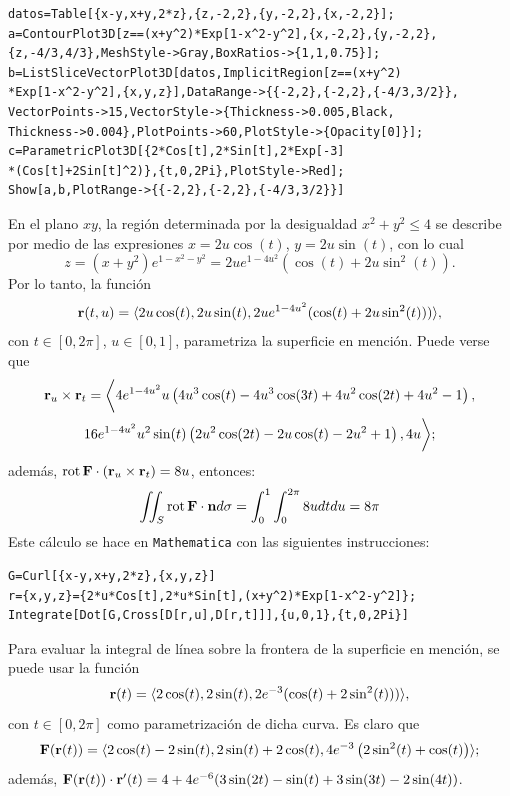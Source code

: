 \begin{tcolorbox}[title=\bf Instrucción \verb"Mathematica"]\begin{Verbatim}[formatcom=\letraverbatim]
datos=Table[{x-y,x+y,2*z},{z,-2,2},{y,-2,2},{x,-2,2}];
a=ContourPlot3D[z==(x+y^2)*Exp[1-x^2-y^2],{x,-2,2},{y,-2,2},
{z,-4/3,4/3},MeshStyle->Gray,BoxRatios->{1,1,0.75}];
b=ListSliceVectorPlot3D[datos,ImplicitRegion[z==(x+y^2)
*Exp[1-x^2-y^2],{x,y,z}],DataRange->{{-2,2},{-2,2},{-4/3,3/2}},
VectorPoints->15,VectorStyle->{Thickness->0.005,Black,
Thickness->0.004},PlotPoints->60,PlotStyle->{Opacity[0]}];
c=ParametricPlot3D[{2*Cos[t],2*Sin[t],2*Exp[-3]
*(Cos[t]+2Sin[t]^2)},{t,0,2Pi},PlotStyle->Red];
Show[a,b,PlotRange->{{-2,2},{-2,2},{-4/3,3/2}}]
\end{Verbatim}
\end{tcolorbox}

En el plano $xy$, la región determinada por la desigualdad $x^2+y^2\leq 4$ se describe por medio de las expresiones
$x=2u\cos(t)$, $y=2u\sin(t)$, con lo cual \[z=(x+y^2)e^{1-x^2-y^2}=2ue^{1-4u^2}(\cos(t)+2u\sin^2(t)).\]
Por lo tanto, la función
\[{\bf r}(t,u) = \langle 2u\cos(t),2u\sin(t) ,2ue^{1-4u^2}(\cos(t)+2u\sin^2(t)))\rangle,\]
con $t\in [0,2\pi]$, $u\in [0,1]$,  parametriza la superficie en mención.
Puede verse que
\begin{gather*}
{\bf r}_u \times {\bf r}_t = \bigg \langle 4 e^{1-4 u^2} u \left(4 u^3 \cos (t)-4 u^3 \cos (3 t)+4 u^2 \cos (2 t)+4 u^2-1\right),\\
16e^{1-4 u^2} u^2 \sin (t) \left(2 u^2 \cos (2t)-2 u \cos (t)-2 u^2+1\right),4 u\bigg \rangle;
\end{gather*}
además,
$\operatorname{rot}{\bf F}\cdot ({\bf r}_u \times {\bf r}_t)= 8u$, entonces:
\begin{equation} \label{stokes9}
\iint_S \operatorname{rot}{\bf F}\cdot {\bf n} d \sigma= \int_0^1\int_0^{2\pi} 8u dtdu =8\pi
\end{equation}
Este cálculo se hace en \verb"Mathematica" con las siguientes instrucciones:

\begin{tcolorbox}[title=\bf Instrucción \verb"Mathematica"]\begin{Verbatim}[formatcom=\letraverbatim]
G=Curl[{x-y,x+y,2*z},{x,y,z}]
r={x,y,z}={2*u*Cos[t],2*u*Sin[t],(x+y^2)*Exp[1-x^2-y^2]};
Integrate[Dot[G,Cross[D[r,u],D[r,t]]],{u,0,1},{t,0,2Pi}]
\end{Verbatim}
\end{tcolorbox}

Para evaluar la integral de línea sobre la frontera de la superficie en mención, se puede usar la función
\[{\bf r}(t) = \langle 2\cos(t),2\sin(t) ,2e^{-3}(\cos(t)+2\sin^2(t)))\rangle,\]
con $t\in [0,2\pi]$ como parametrización de dicha curva. Es claro que
\begin{gather*}
{\bf F}({\bf r}(t))= \langle 2\cos(t)-2\sin(t),2\sin (t)+2\cos(t),4e^{-3}\left(2\sin ^2(t)+\cos(t)\right)\rangle;
\end{gather*}
además,
${\bf F}({\bf r}(t)) \cdot {\bf r}^\prime (t)= 4 + 4e^{-6}(3\sin(2t)-\sin(t)+3\sin(3t)-2\sin(4t))$.

